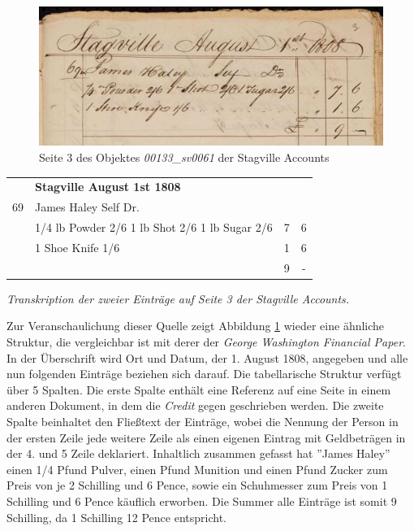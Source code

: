 \documentclass[12pt,a4paper]{article}
\begin{document}
\begin{figure}[H]
  \centering
  \includegraphics[width=1\textwidth]{img/stagville.jpg}  
  \caption[Seite 3 des Objektes \textit{00133\_sv0061} der Stagville Accounts, \protect\url{fromthepage.com/agbedavies/stagville-accounts/00133-sv0061/display/7884}]{Seite 3 des Objektes \textit{00133\_sv0061} der Stagville Accounts} \label{fig:stagville}
\end{figure}
\begin{tabular}{clcc}
  & \textbf{Stagville August 1st 1808}\\
 69 & James Haley Self Dr. & &\\
    & 1/4 lb Powder 2/6 1 lb Shot 2/6 1 lb Sugar 2/6 & 7 & 6\\
	& 1 Shoe Knife 1/6  & 1 & 6\\
	& & 9  & -
\end{tabular}
\medskip
\begin{center}
\textit{Transkription der zweier Einträge auf Seite 3 der Stagville Accounts.}
\end{center}
Zur Veranschaulichung dieser Quelle zeigt Abbildung \ref{fig:stagville} wieder eine ähnliche Struktur, die vergleichbar ist mit derer der \textit{George Washington Financial Paper}. In der Überschrift wird Ort und Datum, der 1. August 1808, angegeben und alle nun folgenden Einträge beziehen sich darauf. Die tabellarische Struktur verfügt über 5 Spalten. Die erste Spalte enthält eine Referenz auf eine Seite in einem anderen Dokument, in dem die \textit{Credit} gegen geschrieben werden. Die zweite Spalte beinhaltet den Fließtext der Einträge, wobei die Nennung der Person in der ersten Zeile jede weitere Zeile als einen eigenen Eintrag mit Geldbeträgen in der 4. und 5 Zeile deklariert. Inhaltlich zusammen gefasst hat ''James Haley'' einen 1/4 Pfund Pulver, einen Pfund Munition und einen Pfund Zucker zum Preis von je 2 Schilling und 6 Pence, sowie ein Schuhmesser zum Preis von 1 Schilling und 6 Pence käuflich erworben. Die Summer alle Einträge ist somit 9 Schilling, da 1 Schilling 12 Pence entspricht.
\end{document}
